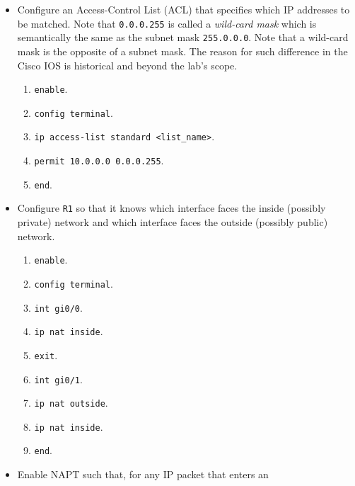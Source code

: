 \documentclass[pdftex,12pt,a4paper]{article}
\begin{document}
            \begin{itemize}
                \item Configure an Access-Control List (ACL) that specifies
                    which IP addresses to be matched. Note that
                    \texttt{0.0.0.255} is called a \emph{wild-card mask} which
                    is semantically the same as the subnet mask
                    \texttt{255.0.0.0}. Note that a wild-card mask is the
                    opposite of a subnet mask. The reason for such difference
                    in the Cisco IOS is historical and beyond the lab's scope.
                    \begin{enumerate}
                        \item \texttt{enable}.
                        \item \texttt{config terminal}.
                        \item \texttt{ip access-list standard <list\_name>}.
                        \item \texttt{permit 10.0.0.0 0.0.0.255}.
                        \item \texttt{end}.
                    \end{enumerate}
                \item Configure \texttt{R1} so that it knows which interface
                    faces the inside (possibly private) network and which
                    interface faces the outside (possibly public) network.
                    \begin{enumerate}
                        \item \texttt{enable}.
                        \item \texttt{config terminal}.
                        \item \texttt{int gi0/0}.
                        \item \texttt{ip nat inside}.
                        \item \texttt{exit}.
                        \item \texttt{int gi0/1}.
                        \item \texttt{ip nat outside}.
                        \item \texttt{ip nat inside}.
                        \item \texttt{end}.
                    \end{enumerate}
                \item Enable NAPT such that, for any IP packet that enters an

\end{itemize}
\end{document}
